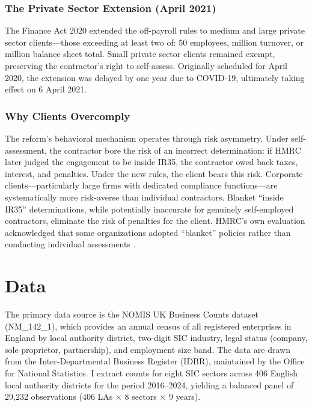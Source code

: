 \documentclass[12pt]{article}
\begin{document}
\subsubsection*{The Private Sector Extension (April 2021)} The Finance Act 2020 extended the off-payroll rules to medium and large private sector clients---those exceeding at least two of: 50 employees,  million turnover, or  million balance sheet total. Small private sector clients remained exempt, preserving the contractor's right to self-assess. Originally scheduled for April 2020, the extension was delayed by one year due to COVID-19, ultimately taking effect on 6 April 2021.

\subsubsection*{Why Clients Overcomply} The reform's behavioral mechanism operates through risk asymmetry. Under self-assessment, the contractor bore the risk of an incorrect determination: if HMRC later judged the engagement to be inside IR35, the contractor owed back taxes, interest, and penalties. Under the new rules, the client bears this risk. Corporate clients---particularly large firms with dedicated compliance functions---are systematically more risk-averse than individual contractors. Blanket ``inside IR35'' determinations, while potentially inaccurate for genuinely self-employed contractors, eliminate the risk of penalties for the client. HMRC's own evaluation acknowledged that some organizations adopted ``blanket'' policies rather than conducting individual assessments \citep{hmrc2024}.

\section{Data}

The primary data source is the NOMIS UK Business Counts dataset (NM\_142\_1), which provides an annual census of all registered enterprises in England by local authority district, two-digit SIC industry, legal status (company, sole proprietor, partnership), and employment size band. The data are drawn from the Inter-Departmental Business Register (IDBR), maintained by the Office for National Statistics. I extract counts for eight SIC sectors across 406 English local authority districts for the period 2016--2024, yielding a balanced panel of 29,232 observations (406 LAs $\times$ 8 sectors $\times$ 9 years).
\end{document}
